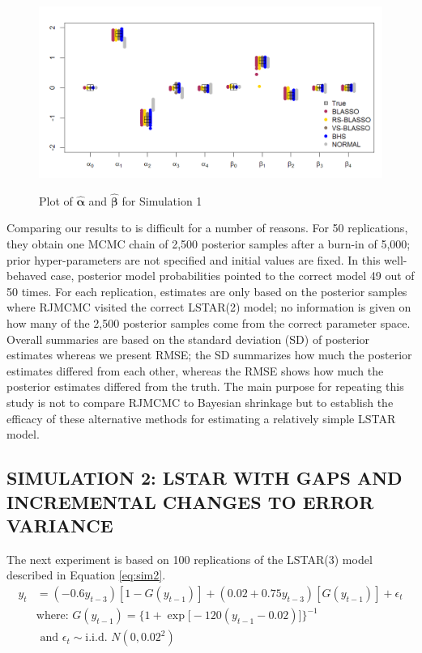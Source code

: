 \begin{figure}[!h]
	\centering
	      \caption{Plot of $\hat{\bm{\alpha}}$ and $\hat{\bm{\beta}}$ for Simulation 1 }
      \includegraphics[scale=0.3]{blassovsbhs}
      \label{fig:blvsbh}
\end{figure}

Comparing our results to \cite{Lopes2006} is difficult for a number of reasons. For 50 replications, they obtain one MCMC chain of 2,500 posterior samples after a burn-in of 5,000; prior hyper-parameters are not specified and initial values are fixed. In this well-behaved case, posterior model probabilities pointed to the correct model 49 out of 50 times. For each replication, estimates are only based on the posterior samples where RJMCMC visited the correct LSTAR(2) model; no information is given on how many of the 2,500 posterior samples come from the correct parameter space. Overall summaries are based on the standard deviation (SD) of posterior estimates whereas we present RMSE; the SD summarizes how much the posterior estimates differed from each other, whereas the RMSE shows how much the posterior estimates differed from the truth. The main purpose for repeating this study is not to compare RJMCMC to Bayesian shrinkage but to establish the efficacy of these alternative methods for estimating a relatively simple LSTAR model. 

\subsection{SIMULATION 2: LSTAR WITH GAPS AND INCREMENTAL CHANGES TO ERROR VARIANCE}

The next experiment is based on 100 replications of the LSTAR(3) model described in Equation \ref{eq:sim2}.
 \begin{equation}
	\begin{split}
		\label{eq:sim2}
		y_t&=(-0.6y_{t-3})[1-G(y_{t-1})] +(0.02+0.75y_{t-3})[G(y_{t-1})]+\epsilon_t\\
		& \textrm{where: } G(y_{t-1})=\bigg\{1+\exp\big[-120(y_{t-1}-0.02)\big]\bigg\}^{-1} \\
		&\textrm{ and }\epsilon_t \sim \textrm{i.i.d. }  N (0,0.02^2)\\
	\end{split}
\end{equation}

